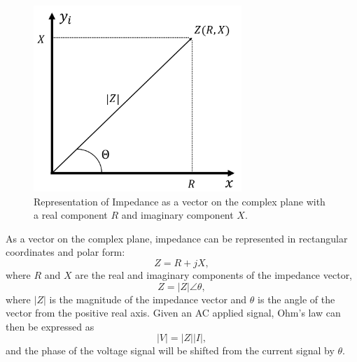  \begin{figure}[ht]
 \centering
 \includegraphics[width=0.7\textwidth]{images/impdedanceDiagram.png}
 \caption[Representation of impedance as a vector on the complex plane]{Representation of Impedance as a vector on the complex plane with a real component $R$ and imaginary component $X$. }
 \label{fig:Impedance_diagram}
 \end{figure}
 
 \par As a vector on the complex plane, impedance can be represented in rectangular coordinates and polar form:
 \begin{equation}
    Z = R + jX,
 \end{equation}
 \noindent where $R$ and $X$ are the real and imaginary components of the impedance vector, 
 \begin{equation}
     Z = |Z| \angle \theta,
     \label{eqn:z_polar}
 \end{equation}
 \noindent where $|Z|$ is the magnitude of the impedance vector and $\theta$ is the angle of the vector from the positive real axis. Given an AC applied signal, Ohm's law can then be expressed as
 \begin{equation}
    |V| = |Z||I|,
    \label{eqn:ohm_mag}
 \end{equation}
 \noindent and the phase of the voltage signal will be shifted from the current signal by $\theta$. 
 
